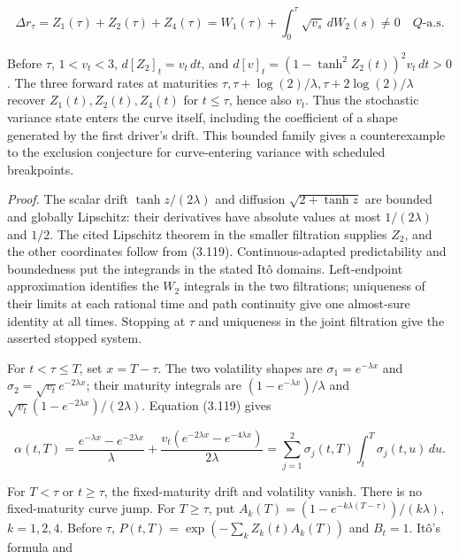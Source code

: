 \documentclass[11pt]{article}
\begin{document}
\begin{equation*}
\Delta r_\tau=Z_1(\tau)+Z_2(\tau)+Z_4(\tau)
=W_1(\tau)+\int_0^\tau\sqrt{v_s}\,dW_2(s)\ne0\quad Q\text{-a.s.} \tag{3.121}\label{eq:3.121}
\end{equation*}

Before \(\tau\), \(1<v_t<3\), \(d[Z_2]_t=v_t\,dt\), and \(d[v]_t=(1-\tanh^2 Z_2(t))^2v_t\,dt>0\). The three forward rates at maturities \(\tau,\tau+\log(2)/\lambda,\tau+2\log(2)/\lambda\) recover \(Z_1(t),Z_2(t),Z_4(t)\) for \(t\le\tau\), hence also \(v_t\). Thus the stochastic variance state enters the curve itself, including the coefficient of a shape generated by the first driver's drift. This bounded family gives a counterexample to the exclusion conjecture for curve-entering variance with scheduled breakpoints.

\emph{Proof.} The scalar drift \(\tanh z/(2\lambda)\) and diffusion \(\sqrt{2+\tanh z}\) are bounded and globally Lipschitz: their derivatives have absolute values at most \(1/(2\lambda)\) and \(1/2\). The cited Lipschitz theorem in the smaller filtration supplies \(Z_2\), and the other coordinates follow from (3.119). Continuous-adapted predictability and boundedness put the integrands in the stated Itô domains. Left-endpoint approximation identifies the \(W_2\) integrals in the two filtrations; uniqueness of their limits at each rational time and path continuity give one almost-sure identity at all times. Stopping at \(\tau\) and uniqueness in the joint filtration give the asserted stopped system.

For \(t<\tau\le T\), set \(x=T-\tau\). The two volatility shapes are \(\sigma_1=e^{-\lambda x}\) and \(\sigma_2=\sqrt{v_t}e^{-2\lambda x}\); their maturity integrals are \((1-e^{-\lambda x})/\lambda\) and \(\sqrt{v_t}(1-e^{-2\lambda x})/(2\lambda)\). Equation (3.119) gives

\begin{equation*}
\alpha(t,T)=\frac{e^{-\lambda x}-e^{-2\lambda x}}{\lambda}
+\frac{v_t(e^{-2\lambda x}-e^{-4\lambda x})}{2\lambda}
=\sum_{j=1}^2\sigma_j(t,T)\int_t^T\sigma_j(t,u)\,du. \tag{3.122}\label{eq:3.122}
\end{equation*}

For \(T<\tau\) or \(t\ge\tau\), the fixed-maturity drift and volatility vanish. There is no fixed-maturity curve jump. For \(T\ge\tau\), put \(A_k(T)=(1-e^{-k\lambda(T-\tau)})/(k\lambda)\), \(k=1,2,4\). Before \(\tau\), \(P(t,T)=\exp(-\sum_k Z_k(t)A_k(T))\) and \(B_t=1\). Itô's formula and
\end{document}
